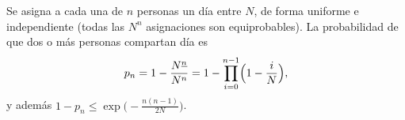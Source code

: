 \begin{proposicion}\label{prop:t3-cumple}
Se asigna a cada una de $n$ personas un día entre $N$, de forma uniforme e independiente (todas las $N^{n}$ asignaciones son equiprobables). La probabilidad de que dos o más personas compartan día es
\[
p_n=1-\frac{N^{\underline{n}}}{N^{n}}=1-\prod_{i=0}^{n-1}\Bigl(1-\frac{i}{N}\Bigr),
\]
y además $1-p_n\le\exp\!\bigl(-\tfrac{n(n-1)}{2N}\bigr)$.
\end{proposicion}

\addtocounter{definicion}{1}%

\addtocounter{figure}{1}%

\addtocounter{definicion}{1}%

\addtocounter{definicion}{1}%


